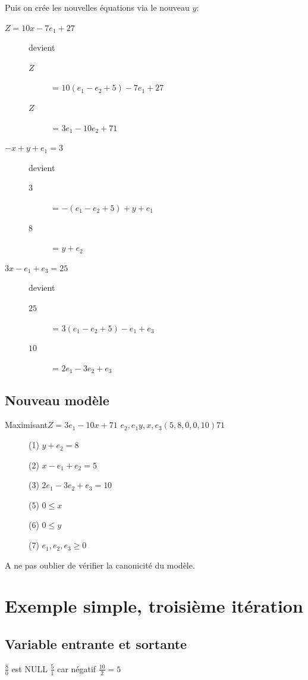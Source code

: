 Puis on crée les nouvelles équations via le nouveau $y$:
\begin{description}
\item[$Z = 10x - 7e_1 + 27$] devient
\begin{description}
\item[$Z$] = $10(e_1 - e_2 + 5) - 7e_1 + 27$
\item[$Z$] = $3e_1 - 10e_2 + 71$
\end{description}
\item[$-x + y + e_1 = 3$] devient
\begin{description}
\item[$3$] = $-(e_1 - e_2 + 5) + y + e_1$
\item[$8$] = $y + e_2$
\end{description}
\item[$3x - e_1 + e_3 = 25$] devient
\begin{description}
\item[$25$] = $3(e_1 - e_2 + 5) -e_1 + e_3$
\item[$10$] = $2e_1 - 3e_2 + e_3$
\end{description}
\end{description}

\subsection{Nouveau modèle}
        {Maximisant}{$Z = 3e_1 - 10x + 71$}
        {$e_2,e_1$}{$y,x,e_3$}{$(5,8,0,0,10)$}{$71$}
        {\begin{description}
\item[] (1) $y + e_2 = 8$
\item[] (2) $x - e_1 + e_2 = 5$
\item[] (3) $2e_1 - 3e_2 + e_3 = 10$
\item[] (5) $ 0 \leq x$
\item[] (6) $ 0 \leq y$
\item[] (7) $ e_1,e_2,e_3 \geq 0$
\end{description}
}

A ne pas oublier de vérifier la canonicité du modèle.\\

\section{Exemple simple, troisième itération}
\subsection{Variable entrante et sortante}
  {$\frac{8}{0}$ est NULL}
  {$\frac{5}{1}$ car négatif}
  {$\frac{10}{2} = 5$}

